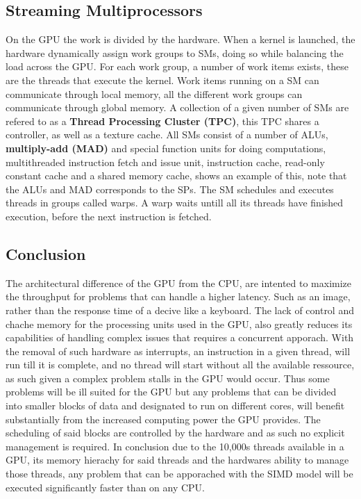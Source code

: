 \subsection{Streaming Multiprocessors}
On the GPU the work is divided by the hardware.
When a kernel is launched, the hardware dynamically assign work groups to SMs, doing so while balancing the load across the GPU.
For each work group, a number of work items exists, these are the threads that execute the kernel.
Work items running on a SM can communicate through local memory, all the different work groups can communicate through global memory. %
A collection of a given number of SMs are refered to as a \textbf{Thread Processing Cluster (TPC)}, this TPC shares a controller, as well as a texture cache.
All SMs consist of a number of ALUs, \textbf{multiply-add (MAD)} and special function units for doing computations, multithreaded instruction fetch and issue unit, instruction cache, read-only constant cache and a shared memory cache,  shows an example of this, note that the ALUs and MAD corresponds to the SPs.
The SM schedules and executes threads in groups called warps.
A warp waits untill all its threads have finished execution, before the next instruction is fetched. 

\subsection{Conclusion} %
The architectural difference of the GPU from the CPU, are intented to maximize the throughput for problems that can handle a higher latency.
Such as an image, rather than the response time of a decive like a keyboard.
The lack of control and chache memory for the processing units used in the GPU, also greatly reduces its capabilities of handling complex issues that requires a concurrent apporach.
With the removal of such hardware as interrupts, an instruction in a given thread, will run till it is complete, and no thread will start without all the available ressource, as such given a complex problem stalls in the GPU would occur.
Thus some problems will be ill suited for the GPU but any problems that can be divided into smaller blocks of data and designated to run on different cores, will benefit substantially from the increased computing power the GPU provides.
The scheduling of said blocks are controlled by the hardware and as such no explicit management is required.
In conclusion due to the 10,000s threads available in a GPU, its memory hierachy for said threads and the hardwares ability to manage those threads, any problem that can be apporached with the SIMD model will be executed significantly faster than on any CPU.

